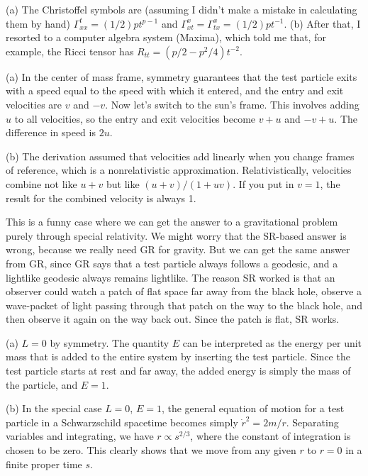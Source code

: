 (a) The Christoffel symbols are (assuming I didn't make a mistake in calculating them by
hand) $\Gamma^t_{xx}=(1/2)pt^{p-1}$ and $\Gamma^x_{xt}=\Gamma^x_{tx}=(1/2)pt^{-1}$.
(b) After that, I resorted to a computer algebra system (Maxima), which told me that, for example,
the Ricci tensor has $R_{tt}=(p/2-p^2/4)t^{-2}$.


(a) In the center of mass frame, symmetry guarantees that the test particle exits with a
 speed equal to the speed with which it entered, and
 the entry and exit velocities are $v$ and $-v$. Now let's switch to the sun's frame. This
 involves adding $u$ to all velocities, so the entry and exit velocities become $v+u$ and $-v+u$.
 The difference in speed is $2u$.

(b) The derivation assumed that velocities add linearly when you change frames of reference, which is a nonrelativistic
 approximation. Relativistically, velocities combine not like $u+v$ but like $(u+v)/(1+uv)$.
 If you put in $v=1$, the result for the combined velocity is always 1.

This is a funny case where we can get the answer to a gravitational problem purely through special relativity. 
We might worry that the SR-based answer is wrong, because we really need GR for gravity. But we can get the
 same answer from GR, since GR says that a test particle always follows a geodesic, and a lightlike geodesic always
 remains lightlike. The reason SR worked is that an observer could watch a patch of flat space far away from the
 black hole, observe a wave-packet of light passing through that patch on the way to the black hole, and
 then observe it again on the way back out. Since the patch is flat, SR works.

(a) $L=0$ by symmetry. The quantity $E$ can be interpreted as the energy per unit mass that is added to the entire
system by inserting the test particle. Since the test particle starts at rest and far away, the added energy is
simply the mass of the particle, and $E=1$.

(b) In the special case $L=0$, $E=1$,
the general equation of motion for a test particle in a Schwarzschild spacetime
becomes simply $\dot{r}^2 = 2m/r$. Separating variables and integrating, we have $r \propto s^{2/3}$,
where the constant of integration is chosen to be zero. This clearly shows that we move from any given
$r$ to $r=0$ in a finite proper time $s$.

